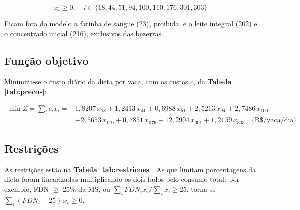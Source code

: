 \documentclass[a4paper,12pt]{article}
\begin{document}
\begin{equation*}
    x_i \geq 0, \quad i \in \{18, 44, 51, 94, 100, 110, 176, 301, 303\}
\end{equation*}

Ficam fora do modelo a farinha de sangue (23), proibida, e o leite integral (202) e o concentrado inicial (216), exclusivos das bezerras.

\subsection{Função objetivo}

Minimiza-se o custo diário da dieta por vaca, com os custos $c_i$ da \textbf{Tabela \ref{tab:precos}}:

\begin{equation}\label{eq:objetivo}
\begin{split}
    \min Z = \sum_i c_i x_i = {} & 1{,}8207\,x_{18} + 1{,}2413\,x_{44} + 0{,}6988\,x_{51} + 2{,}5213\,x_{94} + 2{,}7486\,x_{100} \\
    & + 2{,}5653\,x_{110} + 0{,}7851\,x_{176} + 12{,}2904\,x_{301} + 1{,}2159\,x_{303} \quad \text{(R\$/vaca/dia)}
\end{split}
\end{equation}

\subsection{Restrições}

As restrições estão na \textbf{Tabela \ref{tab:restricoes}}. As que limitam porcentagens da dieta foram linearizadas multiplicando os dois lados pelo consumo total; por exemplo, FDN $\geq$ 25\% da MS, ou $\sum_i FDN_i x_i / \sum_i x_i \geq 25$, torna-se $\sum_i (FDN_i - 25)\, x_i \geq 0$.
\end{document}
